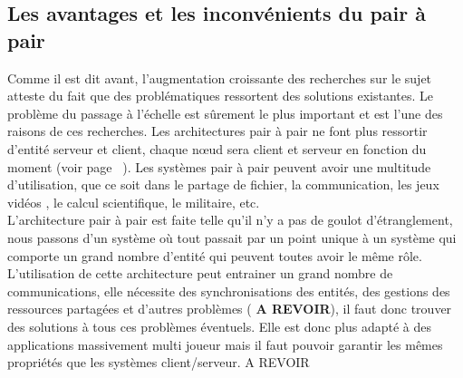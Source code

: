 	\subsection{Les avantages et les inconvénients du pair à pair}
	Comme il est dit avant, l'augmentation croissante des recherches sur le sujet atteste du fait que des problématiques ressortent des solutions existantes. Le problème du passage à l'échelle est sûrement le plus important et est l'une des raisons de ces recherches. Les architectures pair à pair ne font plus ressortir d'entité serveur et client, chaque nœud sera client et serveur en fonction du moment (voir page ~\pageref{P2P/ClServ}). Les systèmes pair à pair peuvent avoir une multitude d'utilisation, que ce soit dans le partage de fichier, la communication, les jeux vidéos , le calcul scientifique, le militaire, etc. \\
	L'architecture pair à pair est faite telle qu'il n'y a pas de goulot d'étranglement, nous passons d'un système où tout passait par un point unique à un système qui comporte un grand nombre d'entité qui peuvent toutes avoir le même rôle. L'utilisation de cette architecture peut entrainer un grand nombre de communications, elle nécessite des synchronisations des entités, des gestions des ressources partagées et d'autres problèmes ( \textbf{A REVOIR}), il faut donc trouver des solutions à tous ces problèmes éventuels. Elle est donc plus adapté à des applications massivement multi joueur mais il faut pouvoir garantir les mêmes propriétés que les systèmes client/serveur. A REVOIR
\\ \newline
	
